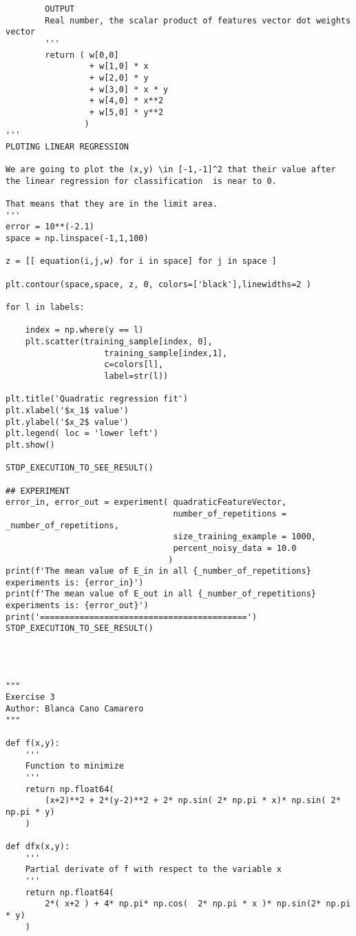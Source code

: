 \begin{verbatim}
        OUTPUT
        Real number, the scalar product of features vector dot weights vector
        '''
        return ( w[0,0]
                 + w[1,0] * x
                 + w[2,0] * y
                 + w[3,0] * x * y
                 + w[4,0] * x**2
                 + w[5,0] * y**2
                )
'''
PLOTING LINEAR REGRESSION 

We are going to plot the (x,y) \in [-1,-1]^2 that their value after 
the linear regression for classification  is near to 0. 

That means that they are in the limit area.  
'''
error = 10**(-2.1)
space = np.linspace(-1,1,100)

z = [[ equation(i,j,w) for i in space] for j in space ]

plt.contour(space,space, z, 0, colors=['black'],linewidths=2 )

for l in labels:
	
	index = np.where(y == l)
	plt.scatter(training_sample[index, 0],
                    training_sample[index,1],
                    c=colors[l],
                    label=str(l))

plt.title('Quadratic regression fit')
plt.xlabel('$x_1$ value')
plt.ylabel('$x_2$ value')
plt.legend( loc = 'lower left')
plt.show()

STOP_EXECUTION_TO_SEE_RESULT()

## EXPERIMENT
error_in, error_out = experiment( quadraticFeatureVector,
                                  number_of_repetitions = _number_of_repetitions,
                                  size_training_example = 1000,
                                  percent_noisy_data = 10.0
                                 )
print(f'The mean value of E_in in all {_number_of_repetitions} experiments is: {error_in}')
print(f'The mean value of E_out in all {_number_of_repetitions} experiments is: {error_out}')
print('==========================================')
STOP_EXECUTION_TO_SEE_RESULT()




"""
Exercise 3 
Author: Blanca Cano Camarero
"""

def f(x,y):
    '''
    Function to minimize
    '''
    return np.float64(
        (x+2)**2 + 2*(y-2)**2 + 2* np.sin( 2* np.pi * x)* np.sin( 2* np.pi * y)
    )

def dfx(x,y):
    '''
    Partial derivate of f with respect to the variable x
    '''
    return np.float64(
        2*( x+2 ) + 4* np.pi* np.cos(  2* np.pi * x )* np.sin(2* np.pi * y)
    )



\end{verbatim}
